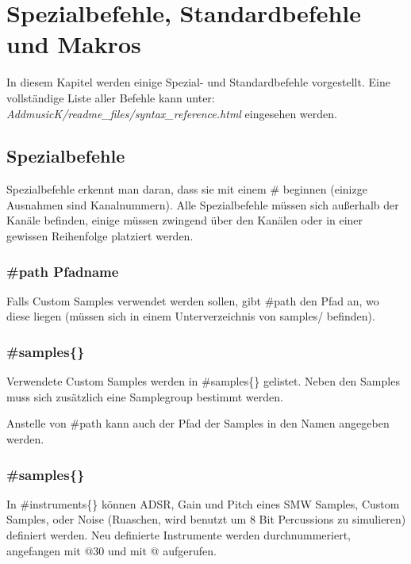 \section{Spezialbefehle, Standardbefehle und Makros}

In diesem Kapitel werden einige Spezial- und Standardbefehle vorgestellt.
Eine vollständige Liste aller Befehle kann unter: \\ \textit{AddmusicK/readme\_files/syntax\_reference.html} eingesehen werden.

\subsection{Spezialbefehle}

Spezialbefehle erkennt man daran, dass sie mit einem \# beginnen (einizge Ausnahmen sind Kanalnummern). Alle Spezialbefehle müssen sich außerhalb der Kanäle befinden, einige müssen zwingend über den Kanälen oder in einer gewissen Reihenfolge platziert werden.


\subsubsection*{\#path \dq Pfadname\dq{}}

Falls Custom Samples verwendet werden sollen, gibt \#path den Pfad an, wo diese liegen (müssen sich in einem Unterverzeichnis von samples/ befinden).

\subsubsection*{\#samples\{\}}

Verwendete Custom Samples werden in \#samples\{\} gelistet. Neben den Samples muss sich zusätzlich eine Samplegroup bestimmt werden.

\medskip



\medskip

Anstelle von \#path kann auch der Pfad der Samples in den Namen angegeben werden.

\subsubsection*{\#samples\{\}}

In \#instruments\{\} können ADSR, Gain und Pitch eines SMW Samples, Custom Samples, oder Noise (Ruaschen, wird benutzt um 8 Bit Percussions zu simulieren) definiert werden. Neu definierte Instrumente werden durchnummeriert, angefangen mit @30 und mit @ aufgerufen.

